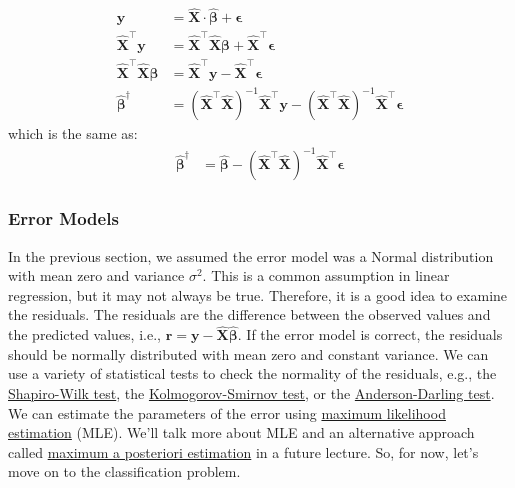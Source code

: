 \documentclass{article}[11pt]
\begin{document}
\begin{align*}
   \mathbf{y} 
   & = \hat{\mathbf{X}}\cdot\hat{\mathbf{\beta}} + \mathbf{\epsilon} \\
   \hat{\mathbf{X}}^{\top}\mathbf{y}
   & = \hat{\mathbf{X}}^{\top}\hat{\mathbf{X}}\mathbf{\beta} + \hat{\mathbf{X}}^{\top}\mathbf{\epsilon} \\
   \hat{\mathbf{X}}^{\top}\hat{\mathbf{X}}\mathbf{\beta} 
    & = \hat{\mathbf{X}}^{\top}\mathbf{y} - \hat{\mathbf{X}}^{\top}\mathbf{\epsilon} \\
    \hat{\mathbf{\beta}}^{\dagger} 
    & = \left(\hat{\mathbf{X}}^{\top}\hat{\mathbf{X}}\right)^{-1}\hat{\mathbf{X}}^{\top}\mathbf{y} - \left(\hat{\mathbf{X}}^{\top}\hat{\mathbf{X}}\right)^{-1}\hat{\mathbf{X}}^{\top}\mathbf{\epsilon}
\end{align*}
which is the same as:
\begin{align*}
   \hat{\mathbf{\beta}}^{\dagger} 
    & = \hat{\mathbf{\beta}} - \left(\hat{\mathbf{X}}^{\top}\hat{\mathbf{X}}\right)^{-1}\hat{\mathbf{X}}^{\top}\mathbf{\epsilon}
\end{align*}

\subsubsection*{Error Models}
In the previous section, we assumed the error model was a Normal distribution with mean zero and variance $\sigma^{2}$. 
This is a common assumption in linear regression, but it may not always be true. Therefore, it is a good idea to examine the residuals. The residuals are the difference between the observed values and the predicted values, i.e., $\mathbf{r} = \mathbf{y} - \hat{\mathbf{X}}\hat{\mathbf{\beta}}$. 
If the error model is correct, the residuals should be normally distributed with mean zero and constant variance. 
We can use a variety of statistical tests to check the normality of the residuals, e.g., 
the \href{https://en.wikipedia.org/wiki/Shapiro–Wilk_test}{Shapiro-Wilk test}, the \href{https://en.wikipedia.org/wiki/Kolmogorov–Smirnov_test}{Kolmogorov-Smirnov test}, 
or the \href{https://en.wikipedia.org/wiki/Anderson–Darling_test}{Anderson-Darling test}.
We can estimate the parameters of the error using \href{https://en.wikipedia.org/wiki/Maximum_likelihood_estimation}{maximum likelihood estimation} (MLE).
We'll talk more about MLE and an alternative approach called \href{https://en.wikipedia.org/wiki/Maximum_a_posteriori_estimation}{maximum a posteriori estimation} in a future lecture. So, for now, let's move on to the classification problem.
\end{document}
